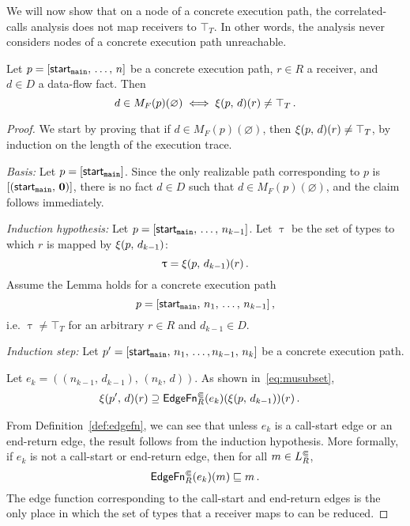 We will now show that on a node of a concrete execution path, the correlated-calls analysis does not map receivers to $\top_T$. In other words, the analysis never considers nodes of a concrete execution path unreachable.

\begin{lemma}\label{lem:sound3}
  Let $p=[\textsf{start}_\texttt{main},\,\dots,\,n]$ be a concrete execution path, $r\in R$ a receiver, and $d\in D$ a data-flow fact. Then
  \begin{equation}
    d\in M_F(p)(\varnothing)\iff\xi(p,\,d)(r)\ne\top_T\,.
  \end{equation}
\end{lemma}
\begin{proof}
  We start by proving that if $d\in M_F(p)(\varnothing)$, then $\xi(p,\,d)(r)\ne\top_T$, by induction on the length of the execution trace.
  
  \textit{Basis:} 
    Let $p=[\textsf{start}_\texttt{main}]$. Since the only realizable path corresponding to $p$ is $[(\textsf{start}_\texttt{main},\,\mathbf0)]$, there is no fact $d\in D$ such that $d\in M_F(p)(\varnothing)$, and the claim follows immediately.
  
  \textit{Induction hypothesis:} 
  Let $p=[\textsf{start}_\texttt{main},\,\dots,\,n_{k-1}]$. Let $\uptau$ be the set of types to which $r$ is mapped by $\xi(p,\,d_{k-1})$:
  \begin{equation}
    \uptau=\xi(p,\,d_{k-1})(r)\,.
  \end{equation}
  Assume the Lemma holds for a concrete execution path $$p=[\textsf{start}_\texttt{main},\,n_1,\,\dots,\,n_{k-1}]\,,$$ i.e. $\uptau\ne\top_T$ for an arbitrary $r\in R$ and $d_{k-1}\in D$.
  
  \textit{Induction step:}
    Let $p'=[\textsf{start}_\texttt{main},\,n_1,\,\dots,n_{k-1},\,n_k]$ be a concrete execution path.
    
    Let $e_k=((n_{k-1},\,d_{k-1}),\,(n_k,\,d))$. As shown in~\eqref{eq:musubset},
    \begin{align*}
      \xi(p',\,d)(r)
        &\supseteq\textsf{EdgeFn}^\Subset_{R}(e_k)(\xi(p,\,d_{k-1}))(r)\,.
    \end{align*}

    From Definition~\ref{def:edgefn}, we can see that unless $e_k$ is a call-start edge or an end-return edge, the result follows from the induction hypothesis.
    More formally, if $e_k$ is not a call-start or end-return edge, then for all $m\in L^\Subset_R$,
    \[
      \textsf{EdgeFn}^\Subset_{R}(e_k)(m)\sqsubseteq m\,.
    \]
     The edge function corresponding to the call-start and end-return edges is the only place in which the set of types that a receiver maps to can be reduced.
    

\end{proof}
